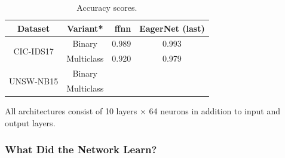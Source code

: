 \documentclass[conference]{IEEEtran}
\begin{document}
\begin{table}

\centering
\begin{tabular}{ccrc}
\toprule
\textbf{Dataset} & \textbf{Variant*} & \textbf{\gls{ffnn}} & \textbf{EagerNet (last)} \\
\midrule
\multirow{2}{*}{CIC-IDS17} & Binary & 0.989 & 0.993 \\
 & Multiclass & 0.920 & 0.979 \\
\midrule
\multirow{2}{*}{UNSW-NB15} & Binary & & \\
 & Multiclass & & \\
\midrule

\end{tabular}
\vspace{1ex}

{\raggedright * All architectures consist of 10 layers $\times$ 64 neurons in addition to input and output layers. \par}
\caption{Accuracy scores.}


\end{table}

\subsubsection{What Did the Network Learn?}
\end{document}
